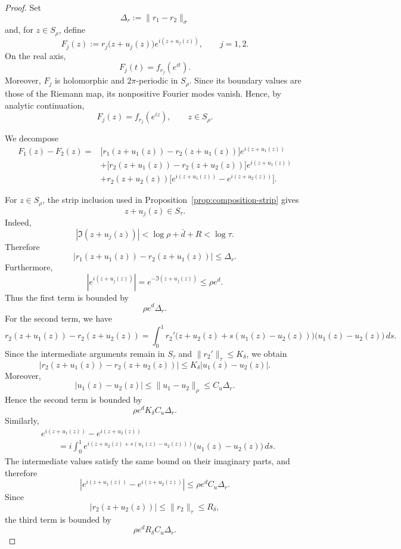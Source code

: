 \documentclass[11pt,a4paper]{amsart}
\begin{document}
\begin{proof}
	Set
	\[
	\Delta_r:=\|r_1-r_2\|_\sigma
	\]
	and, for $z\in S_\rho$, define
	\[
	F_j(z)
	:=
	r_j\bigl(z+u_j(z)\bigr)
	e^{i(z+u_j(z))},
	\qquad j=1,2.
	\]
	On the real axis,
	\[
	F_j(t)=f_{r_j}(e^{it}).
	\]
	Moreover, $F_j$ is holomorphic and $2\pi$-periodic in $S_\rho$.
	Since its boundary values are those of the Riemann map, its
	nonpositive Fourier modes vanish. Hence, by analytic continuation,
	\begin{equation}\label{eq:F-f-identification}
		F_j(z)=f_{r_j}(e^{iz}),
		\qquad z\in S_\rho.
	\end{equation}
	
	We decompose
	\[
	\begin{aligned}
		F_1(z)-F_2(z)
		={}&
		\bigl[
		r_1(z+u_1(z))-r_2(z+u_1(z))
		\bigr]e^{i(z+u_1(z))}
		\\
		&+
		\bigl[
		r_2(z+u_1(z))-r_2(z+u_2(z))
		\bigr]e^{i(z+u_1(z))}
		\\
		&+
		r_2(z+u_2(z))
		\bigl[
		e^{i(z+u_1(z))}-e^{i(z+u_2(z))}
		\bigr].
	\end{aligned}
	\]
	
	For $z\in S_\rho$, the strip inclusion used in
	Proposition~\ref{prop:composition-strip} gives
	\[
	z+u_j(z)\in S_\tau.
	\]
	Indeed,
	\[
	|\Im(z+u_j(z))|
	<
	\log\rho+\bar d+R
	<
	\log\tau.
	\]
	Therefore
	\[
	|r_1(z+u_1(z))-r_2(z+u_1(z))|
	\le
	\Delta_r.
	\]
	Furthermore,
	\[
	|e^{i(z+u_j(z))}|
	=
	e^{-\Im(z+u_j(z))}
	\le
	\rho e^d.
	\]
	Thus the first term is bounded by
	\[
	\rho e^d\Delta_r.
	\]
	For the second term, we have
	\[r_2(z+u_1(z))-r_2(z+u_2(z))=
		\int_0^1 r_2'\bigl(z+u_2(z)+s(u_1(z)-u_2(z))\bigr)
		\bigl(u_1(z)-u_2(z)\bigr)\,ds .
	\]
	Since the intermediate arguments remain in $S_\tau$ and
	$\|r_2'\|_\tau\le K_\delta$, we obtain
	\[
	|r_2(z+u_1(z))-r_2(z+u_2(z))|
	\le
	K_\delta |u_1(z)-u_2(z)|.
	\]
	Moreover,
	\[
	|u_1(z)-u_2(z)|
	\le
	\|u_1-u_2\|_\rho
	\le
	C_u\Delta_r.
	\]
	Hence the second term is bounded by
	\[
	\rho e^d K_\delta C_u\Delta_r.
	\]
	Similarly,
	\[
	\begin{aligned}
		&e^{i(z+u_1(z))}-e^{i(z+u_2(z))}
		\\
		&\qquad =
		i\int_0^1
		e^{i(z+u_2(z)+s(u_1(z)-u_2(z)))}
		\bigl(u_1(z)-u_2(z)\bigr)\,ds .
	\end{aligned}
	\]
	The intermediate values satisfy the same bound on their imaginary
	parts, and therefore
	\[
	\left|
	e^{i(z+u_1(z))}-e^{i(z+u_2(z))}
	\right|
	\le
	\rho e^d C_u\Delta_r.
	\]
	Since
	\[
	|r_2(z+u_2(z))|
	\le
	\|r_2\|_\tau
	\le
	R_\delta,
	\]
	the third term is bounded by
	\[
	\rho e^d R_\delta C_u\Delta_r.
	\]
	

\end{proof}
\end{document}
